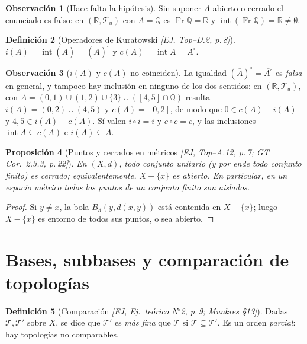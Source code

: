 \documentclass[11pt,a4paper]{article}
\theoremstyle{definition}
\newtheorem{definicion}{Definición}[section]
\newtheorem{observacion}[definicion]{Observación}
\theoremstyle{plain}
\newtheorem{proposicion}[definicion]{Proposición}
\newcommand{\fnt}[1]{{\normalfont\small\itshape\color{gray!150!black}[#1]}}
\newcommand{\R}{\mathbb{R}}
\newcommand{\Q}{\mathbb{Q}}
\newcommand{\cl}[1]{\overline{#1}}
\newcommand{\intr}{\operatorname{int}}
\newcommand{\fr}{\operatorname{Fr}}
\newcommand{\Bola}[2]{B_d(#1,#2)}
\newcommand{\tp}{\mathcal{T}}
\begin{document}
\begin{observacion}[Hace falta la hipótesis]
Sin suponer $A$ abierto o cerrado el enunciado es falso: en $(\R,\tp_u)$ con $A=\Q$ es $\fr\Q=\R$ y $\intr(\fr\Q)=\R\ne\emptyset$.
\end{observacion}

\begin{definicion}[Operadores de Kuratowski \fnt{EJ, Top--D.2, p.\,8}]
$i(A)=\intr(\cl A)=(\cl A)^{\circ}$ y $c(A)=\cl{\intr A}=\cl{A^{\circ}}$.
\end{definicion}

\begin{observacion}[$i(A)$ y $c(A)$ no coinciden]
La igualdad $(\cl A)^{\circ}=\cl{A^{\circ}}$ es \emph{falsa} en general, y tampoco hay inclusión en ninguno de los dos sentidos: en $(\R,\tp_u)$, con $A=(0,1)\cup(1,2)\cup\{3\}\cup([4,5]\cap\Q)$ resulta $i(A)=(0,2)\cup(4,5)$ y $c(A)=[0,2]$, de modo que $0\in c(A)-i(A)$ y $4{,}5\in i(A)-c(A)$. Sí valen $i\circ i=i$ y $c\circ c=c$, y las inclusiones $\intr A\subseteq c(A)$ e $i(A)\subseteq\cl A$.
\end{observacion}

\begin{proposicion}[Puntos y cerrados en métricos \fnt{EJ, Top--A.12, p.\,7; GT Cor.\ 2.3.3, p.\,22}]
En $(X,d)$, todo conjunto unitario (y por ende todo conjunto finito) es cerrado; equivalentemente, $X-\{x\}$ es abierto. En particular, en un espacio métrico todos los puntos de un conjunto finito son aislados.
\end{proposicion}

\begin{proof}
Si $y\ne x$, la bola $\Bola{y}{d(x,y)}$ está contenida en $X-\{x\}$; luego $X-\{x\}$ es entorno de todos sus puntos, o sea abierto.
\end{proof}


\section{Bases, subbases y comparación de topologías}\label{sec:bases}

\begin{definicion}[Comparación \fnt{EJ, Ej.\ teórico N$^\circ$2, p.\,9; Munkres \S13}]
Dadas $\tp,\tp'$ sobre $X$, se dice que $\tp'$ es \emph{más fina} que $\tp$ si $\tp\subseteq\tp'$. Es un orden \emph{parcial}: hay topologías no comparables.
\end{definicion}
\end{document}
